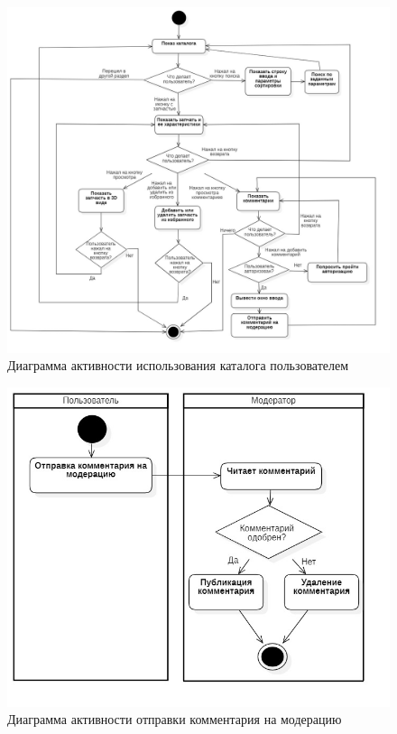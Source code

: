 \documentclass[14pt]{extreport}
\begin{document}
\begin{figure}[H]
\centerline{\includegraphics[width=1.05\linewidth]{act_pols}}
\caption{Диаграмма активности использования каталога пользователем}
\label{fig5}
\end{figure}

\begin{figure}[H]
\centerline{\includegraphics[width=0.6\linewidth]{act_kom}}
\caption{Диаграмма активности отправки комментария на модерацию}
\label{fig6}
\end{figure}
\end{document}
